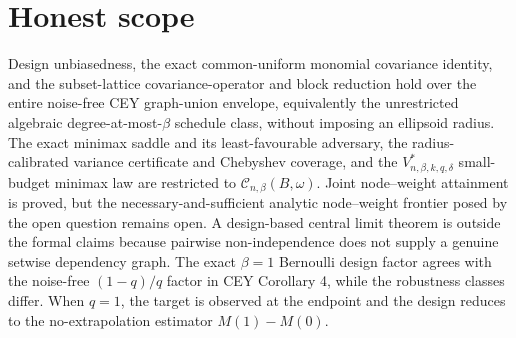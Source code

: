 \documentclass{article}
\begin{document}
\section{Honest scope}

Design unbiasedness, the exact common-uniform monomial covariance identity, and the subset-lattice covariance-operator and block reduction hold over the entire noise-free CEY graph-union envelope, equivalently the unrestricted algebraic degree-at-most-\(\beta\) schedule class, without imposing an ellipsoid radius. The exact minimax saddle and its least-favourable adversary, the radius-calibrated variance certificate and Chebyshev coverage, and the \(V^*_{n,\beta,k,q,\delta}\) small-budget minimax law are restricted to \(\mathcal C_{n,\beta}(B,\omega)\). Joint node--weight attainment is proved, but the necessary-and-sufficient analytic node--weight frontier posed by the open question remains open. A design-based central limit theorem is outside the formal claims because pairwise non-independence does not supply a genuine setwise dependency graph. The exact \(\beta=1\) Bernoulli design factor agrees with the noise-free \((1-q)/q\) factor in CEY Corollary 4, while the robustness classes differ. When \(q=1\), the target is observed at the endpoint and the design reduces to the no-extrapolation estimator \(M(1)-M(0)\).
\end{document}
